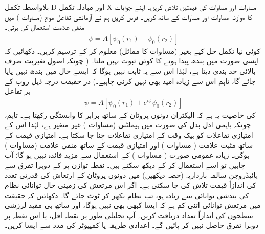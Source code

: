  
بلاواسطہ تکمل D اور مبادلہ تکمل X مساوات  اور مساوات  کی قیمتیں تلاش کریں۔ اپنے جوابات کا موازنہ مساوات  اور مساوات  کے ساتھ کریں۔ 
فرض کریں ہم نے آزمائشی تفاعل موج (مساوات ) میں منفی علامت استعمال کی ہوتی۔
\begin{align}\label{مساوات_تغیریت_منفی_علامت_آزمائشی}
\psi=A[\psi_{0}(r_{1})-\psi_{0}(r_{2})]
\end{align}
 کوئی نیا تکمل حل کیے بغیر (مساوات  کا مماثل)  معلوم کر کے ترسیم کریں۔ دکھائیں کہ ایسی صورت میں بندھ پیدا ہونے کا کوئی ثبوت نہیں ملتا۔ ( چونکہ اصول تغیریت صرف بالائی حد بندی دیتا ہے، لہٰذا اس سے یہ ثابت نہیں ہوگا کہ ایسے حال میں بندھ نہیں پایا جائے گا، تاہم اس سے زیادہ امید بھی نہیں کرنی چاہیے۔)  در حقیقت درجہ ذیل روپ کے ہر تفاعل 
\begin{align}\label{مساوات_تغیریت_ہر_تفاعل}
\psi=A[\psi_{0}(r_{1})+e^{i\phi}\psi_{0}(r_{2})]
\end{align}
 کی خاصیت یہ ہے کہ الیکٹران دونوں پروٹان کے ساتھ برابر کا وابستگی رکھتا ہے۔ تاہم، چونکہ باہمی ادل بدل  کی صورت میں ہیملٹنی (مساوات ) غیر متغیر ہے، لہٰذا اس کے امتیازی تفاعلات کو بیک وقت  کے امتیازی تفاعلات چنا جا سکتا ہے۔ امتیازی قیمت  کے ساتھ مثبت علامت
 ( مساوات ) اور امتیازی قیمت  کے ساتھ منفی علامت (مساوات ) ہوگی۔ زیادہ عمومی صورت ( مساوات ) کے استعمال سے مزید فائدہ نہیں ہو گا؛ آپ چاہیں تو اسے استعمال کر کے دیکھ سکتے ہیں۔ 
نقطہ توازن پر  کے دوہرا تفرق سے ہائیڈروجن سالمہ بارداریہ (حصہ  دیکھیں) میں دونوں پروٹان کے ارتعاش کی قدرتی تعدد  کی اندازاً قیمت تلاش کی جا سکتی ہے۔ اگر اس مرتعش کی زمینی حال توانائی  نظام کی بندشی توانائی سے زیادہ ہو، تب نظام بکھر کر ٹوٹ جائے گا۔ دکھائیں کہ حقیقت میں مرتعش توانائی اتنی کم ہے کہ ایسا کبھی بھی نہیں ہوگا، اور ساتھ ہی مقید لرزشی سطحوں کی اندازاً تعداد دریافت کریں۔  آپ تحلیلی طور پر  نقطہ اقل، یا اس نقطہ پر دوہرا تفرق حاصل نہیں کر پائیں گے۔ اعدادی طریقہ یا کمپیوٹر کی مدد سے ایسا کریں۔

